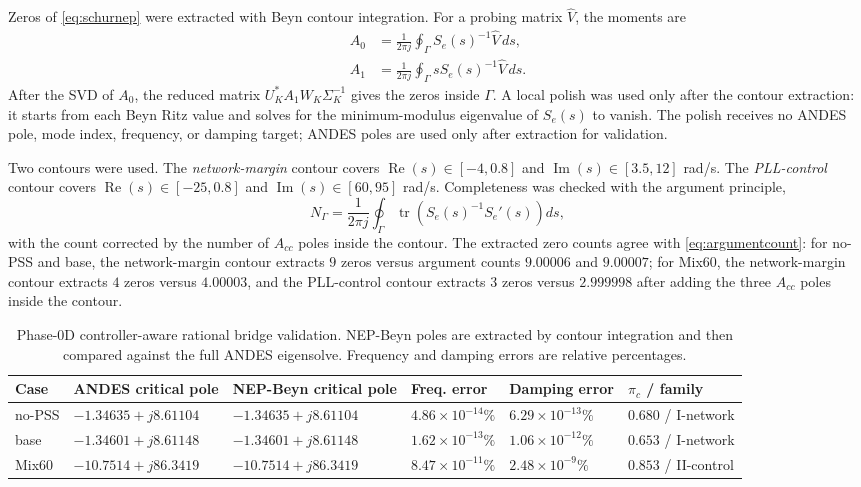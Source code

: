 \documentclass[journal]{IEEEtran}
\newcommand{\Real}{\operatorname{Re}}
\newcommand{\Imag}{\operatorname{Im}}
\begin{document}
Zeros of \eqref{eq:schurnep} were extracted with Beyn contour integration. For a probing matrix $\widehat V$, the moments are
\begin{align}
A_0&=\frac{1}{2\pi j}\oint_\Gamma S_e(s)^{-1}\widehat V\,ds,\\
A_1&=\frac{1}{2\pi j}\oint_\Gamma sS_e(s)^{-1}\widehat V\,ds.
\end{align}
After the SVD of $A_0$, the reduced matrix $U_K^\ast A_1 W_K\Sigma_K^{-1}$ gives the zeros inside $\Gamma$. A local polish was used only after the contour extraction: it starts from each Beyn Ritz value and solves for the minimum-modulus eigenvalue of $S_e(s)$ to vanish. The polish receives no ANDES pole, mode index, frequency, or damping target; ANDES poles are used only after extraction for validation.

Two contours were used. The \emph{network-margin} contour covers $\Real(s)\in[-4,0.8]$ and $\Imag(s)\in[3.5,12]$ rad/s. The \emph{PLL-control} contour covers $\Real(s)\in[-25,0.8]$ and $\Imag(s)\in[60,95]$ rad/s. Completeness was checked with the argument principle,
\begin{equation}
N_\Gamma=\frac{1}{2\pi j}\oint_\Gamma \operatorname{tr}\left(S_e(s)^{-1}S_e'(s)\right)ds,
\label{eq:argumentcount}
\end{equation}
with the count corrected by the number of $A_{cc}$ poles inside the contour. The extracted zero counts agree with \eqref{eq:argumentcount}: for no-PSS and base, the network-margin contour extracts $9$ zeros versus argument counts $9.00006$ and $9.00007$; for Mix60, the network-margin contour extracts $4$ zeros versus $4.00003$, and the PLL-control contour extracts $3$ zeros versus $2.999998$ after adding the three $A_{cc}$ poles inside the contour.

\begin{table}[t]
\centering
\caption{Phase-0D controller-aware rational bridge validation. NEP-Beyn poles are extracted by contour integration and then compared against the full ANDES eigensolve. Frequency and damping errors are relative percentages.}
\label{tab:phase0d}
\scriptsize
\begin{tabular}{@{}p{}p{}p{}p{}p{}p{}@{}}
\toprule
Case & ANDES critical pole & NEP-Beyn critical pole & Freq. error & Damping error & $\pi_c$ / family\\
\midrule
no-PSS
& $-1.34635+j8.61104$
& $-1.34635+j8.61104$
& $4.86{\times}10^{-14}\%$
& $6.29{\times}10^{-13}\%$
& $0.680$ / I-network\\
base
& $-1.34601+j8.61148$
& $-1.34601+j8.61148$
& $1.62{\times}10^{-13}\%$
& $1.06{\times}10^{-12}\%$
& $0.653$ / I-network\\
Mix60
& $-10.7514+j86.3419$
& $-10.7514+j86.3419$
& $8.47{\times}10^{-11}\%$
& $2.48{\times}10^{-9}\%$
& $0.853$ / II-control\\
\bottomrule
\end{tabular}
\end{table}
\end{document}
